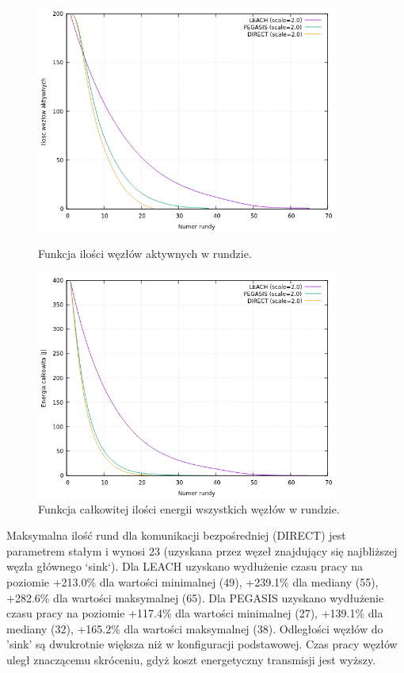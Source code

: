 \documentclass[a4paper,12pt,twoside,openany]{report}
\begin{document}
\begin{figure}[H]
 \centering
 \includegraphics[width=10cm]{images/gnuplot/test_3/nodes_in_round_xy400.png}
 \caption{Funkcja ilości węzłów aktywnych w rundzie.}
 \includegraphics[width=10cm]{images/gnuplot/test_3/energy_in_round_xy400.png}
 \caption{Funkcja całkowitej ilości energii wszystkich węzłów w rundzie.}
\end{figure}

\par
Maksymalna ilość rund dla komunikacji bezpośredniej (DIRECT) jest parametrem stałym i wynosi 23 (uzyskana przez węzeł znajdujący się najbliższej węzła głównego `sink`).
Dla LEACH uzyskano wydłużenie czasu pracy na poziomie +213.0\% dla wartości minimalnej (49), +239.1\% dla mediany (55), +282.6\% dla wartości maksymalnej (65).
Dla PEGASIS uzyskano wydłużenie czasu pracy na poziomie +117.4\% dla wartości minimalnej (27), +139.1\% dla mediany (32), +165.2\% dla wartości maksymalnej (38).
Odległości węzłów do 'sink' są dwukrotnie większa niż w konfiguracji podstawowej. Czas pracy węzłów uległ znaczącemu skróceniu, gdyż koszt energetyczny transmisji jest wyższy.
\end{document}
